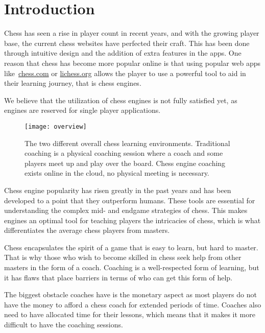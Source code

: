 \chapter{Introduction}\label{ch:introduction}

Chess has seen a rise in player count in recent years, and with the growing player base, the current chess websites have
perfected their craft.
This has been done through intuitive design and the addition of extra features in the apps.
One reason that chess has become more popular online is that using popular web apps like~\url{chess.com} or
\url{lichess.org} allows the player to use a powerful tool to aid in their learning journey, that is chess engines.

We believe that the utilization of chess engines is not fully satisfied yet, as engines are reserved for single player
applications.

\begin{figure}[htb]
    \centering
    \texttt{[image: overview]}
    \caption{The two different overall chess learning environments.
    Traditional coaching is a physical coaching session where a coach and some players meet up and play over the board.
    Chess engine coaching exists online in the cloud, no physical meeting is necessary.}\label{fig:project-overview}
\end{figure}

Chess engine popularity has risen greatly in the past years and has been developed to a point that they
outperform humans.
These tools are essential for understanding the complex mid- and endgame strategies of chess.
This makes engines an optimal tool for teaching players the intricacies of chess, which is what
differentiates the average chess players from masters.

Chess encapsulates the spirit of a game that is easy to learn, but hard to master.
That is why those who wish to become skilled in chess seek help from other masters in the form of a coach.
Coaching is a well-respected form of learning, but it has flaws that place barriers in terms of who can get this form of
help.

The biggest obstacle coaches have is the monetary aspect as most players do not have the money to afford a chess coach
for extended periods of time.
Coaches also need to have allocated time for their lessons, which means that it makes it more difficult to have the
coaching sessions.


